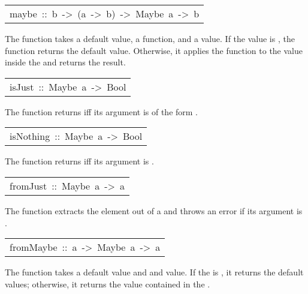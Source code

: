 \begin{haddockdesc}
\item[\begin{tabular}{@{}l}
maybe\ ::\ b\ ->\ (a\ ->\ b)\ ->\ Maybe\ a\ ->\ b
\end{tabular}]\haddockbegindoc
The  function takes a default value, a function, and a 
 value.  If the  value is , the function returns the
 default value.  Otherwise, it applies the function to the value inside
 the  and returns the result.
\par

\end{haddockdesc}
\begin{haddockdesc}
\item[\begin{tabular}{@{}l}
isJust\ ::\ Maybe\ a\ ->\ Bool
\end{tabular}]\haddockbegindoc
The  function returns  iff its argument is of the
 form .
\par

\end{haddockdesc}
\begin{haddockdesc}
\item[\begin{tabular}{@{}l}
isNothing\ ::\ Maybe\ a\ ->\ Bool
\end{tabular}]\haddockbegindoc
The  function returns  iff its argument is .
\par

\end{haddockdesc}
\begin{haddockdesc}
\item[\begin{tabular}{@{}l}
fromJust\ ::\ Maybe\ a\ ->\ a
\end{tabular}]\haddockbegindoc
The  function extracts the element out of a  and
 throws an error if its argument is .
\par

\end{haddockdesc}
\begin{haddockdesc}
\item[\begin{tabular}{@{}l}
fromMaybe\ ::\ a\ ->\ Maybe\ a\ ->\ a
\end{tabular}]\haddockbegindoc
The  function takes a default value and and 
 value.  If the  is , it returns the default values;
 otherwise, it returns the value contained in the .
\par

\end{haddockdesc}

